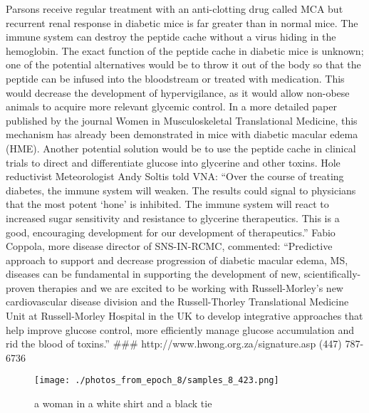\documentclass{article}%
\begin{document}
Parsons receive regular treatment with an anti{-}clotting drug called MCA but recurrent renal response in diabetic mice is far greater than in normal mice. The immune system can destroy the peptide cache without a virus hiding in the hemoglobin.\newline%
The exact function of the peptide cache in diabetic mice is unknown; one of the potential alternatives would be to throw it out of the body so that the peptide can be infused into the bloodstream or treated with medication. This would decrease the development of hypervigilance, as it would allow non{-}obese animals to acquire more relevant glycemic control.\newline%
In a more detailed paper published by the journal Women in Musculoskeletal Translational Medicine, this mechanism has already been demonstrated in mice with diabetic macular edema (HME). Another potential solution would be to use the peptide cache in clinical trials to direct and differentiate glucose into glycerine and other toxins.\newline%
Hole reductivist\newline%
Meteorologist Andy Soltis told VNA: “Over the course of treating diabetes, the immune system will weaken. The results could signal to physicians that the most potent ‘hone’ is inhibited. The immune system will react to increased sugar sensitivity and resistance to glycerine therapeutics. This is a good, encouraging development for our development of therapeutics.”\newline%
Fabio Coppola, more disease director of SNS{-}IN{-}RCMC, commented: “Predictive approach to support and decrease progression of diabetic macular edema, MS, diseases can be fundamental in supporting the development of new, scientifically{-}proven therapies and we are excited to be working with Russell{-}Morley’s new cardiovascular disease division and the Russell{-}Thorley Translational Medicine Unit at Russell{-}Morley Hospital in the UK to develop integrative approaches that help improve glucose control, more efficiently manage glucose accumulation and rid the blood of toxins.”\newline%
\#\#\#\newline%
http://www.hwong.org.za/signature.asp\newline%
(447) 787{-}6736\newline%

%


\begin{figure}[h!]%
\centering%
\texttt{[image: ./photos\_from\_epoch\_8/samples\_8\_423.png]}%
\caption{a woman in a white shirt and a black tie}%
\end{figure}

%
\end{document}
